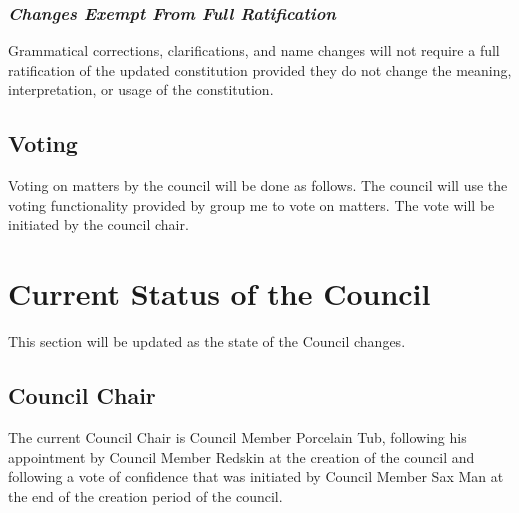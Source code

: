\documentclass[]{article}
\begin{document}
\subsubsection{\textit{Changes Exempt From Full Ratification}}
Grammatical corrections, clarifications, and name changes will not require a full ratification of the updated constitution provided they do not change the meaning, interpretation, or usage of the constitution.

\subsection{Voting}
\label{subsec:voting}
Voting on matters by the council will be done as follows. The council will use the voting functionality provided by group me to vote on matters. The vote will be initiated by the council chair.
\newpage
\section{Current Status of the Council}
\label{sec:status}
This section will be updated as the state of the Council changes.

\subsection{Council Chair}
The current Council Chair is Council Member Porcelain Tub, following his appointment by Council Member Redskin at the creation of the council and following a vote of confidence that was initiated by Council Member Sax Man at the end of the creation period of the council.
\end{document}
